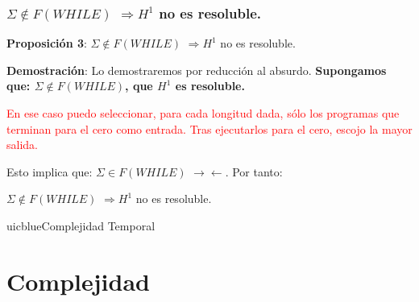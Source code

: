 \documentclass[xcolor=table]{beamer}
\begin{document}
\begin{frame}[fragile]\frametitle{ $\Sigma \notin  F(WHILE)$  $\Rightarrow H^1$ no es resoluble.} \scriptsize

\textbf{Proposición 3}: $\Sigma \notin  F(WHILE)$ $\Rightarrow H^1$ no es resoluble.

\hspace{1cm}

\textbf{Demostración}: Lo demostraremos por reducción al absurdo.
\textbf{Supongamos que: $\Sigma \notin F(WHILE)$, que $H^1$ es resoluble.}

\hspace{0.3cm}

\textcolor{red}{En ese caso puedo seleccionar, para cada longitud dada, sólo los programas que terminan para el cero como entrada. Tras ejecutarlos para el cero, escojo la mayor salida.}

\hspace{0.3cm}

Esto implica que: $\Sigma \in F(WHILE)$ $\rightarrow \leftarrow$. Por tanto:

\begin{center}
$\Sigma \notin  F(WHILE)$ $\Rightarrow H^1$ no es resoluble.    
\end{center}


\end{frame}

\begin{chapter}{uicblue}{Complejidad Temporal}
\end{chapter}



\section{Complejidad}
\end{document}
